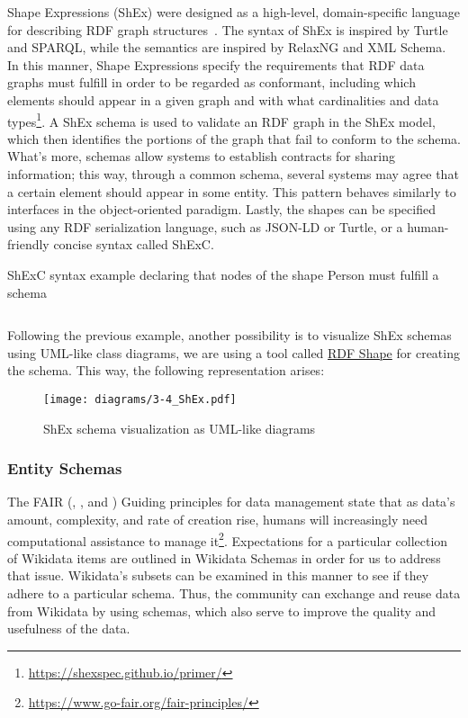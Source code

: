 Shape Expressions (ShEx) were designed as a high-level, domain-specific language for describing RDF graph structures~\cite{https://doi.org/10.48550/arxiv.2110.11709}. The syntax of ShEx is inspired by Turtle and SPARQL, while the semantics are inspired by RelaxNG and XML Schema. In this manner, Shape Expressions specify the requirements that RDF data graphs must fulfill in order to be regarded as conformant, including which elements should appear in a given graph and with what cardinalities and data types\footnote{\url{https://shexspec.github.io/primer/}}. A ShEx schema is used to validate an RDF graph in the ShEx model, which then identifies the portions of the graph that fail to conform to the schema. What's more, schemas allow systems to establish contracts for sharing information; this way, through a common schema, several systems may agree that a certain element should appear in some entity. This pattern behaves similarly to interfaces in the object-oriented paradigm. Lastly, the shapes can be specified using any RDF serialization language, such as JSON-LD or Turtle, or a human-friendly concise syntax called ShExC.

\begin{code}
    \caption{ShExC syntax example declaring that nodes of the shape Person must fulfill a schema}
    \inputminted{shex}{listings/shex.shex}
\end{code}

Following the previous example, another possibility is to visualize ShEx schemas using UML-like class diagrams, we are using a tool called \href{https://rdfshape.weso.es/shexInfo}{RDF Shape} for creating the schema. This way, the following representation arises:

\begin{figure}[ht]
    \centering
    \texttt{[image: diagrams/3-4\_ShEx.pdf]}
    \caption{ShEx schema visualization as UML-like diagrams}
\end{figure}

\subsubsection{Entity Schemas}

The FAIR (, ,  and ) Guiding principles for data management state that as data's amount, complexity, and rate of creation rise, humans will increasingly need computational assistance to manage it\footnote{\url{https://www.go-fair.org/fair-principles/}}. Expectations for a particular collection of Wikidata items are outlined in Wikidata Schemas in order for us to address that issue. Wikidata's subsets can be examined in this manner to see if they adhere to a particular schema. Thus, the community can exchange and reuse data from Wikidata by using schemas, which also serve to improve the quality and usefulness of the data.

